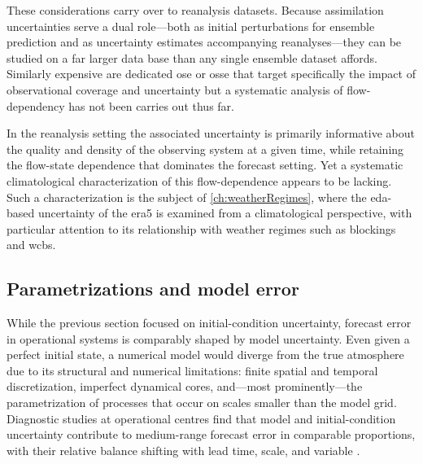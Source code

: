These considerations carry over to reanalysis datasets. Because
assimilation uncertainties serve a dual role---both as initial
perturbations for ensemble prediction
\parencite[ch.~6]{kalnayEarthSystemModeling2024} and as uncertainty estimates
accompanying reanalyses---they can be studied
on a far larger data base than any single ensemble dataset affords.
Similarly expensive are dedicated \gls{ose} or \gls{osse} that target
specifically the impact of observational coverage and uncertainty but
a systematic analysis of flow-dependency has not been carries out thus far.

In the
reanalysis setting the associated uncertainty is primarily informative
about the quality and density of the observing system at a given time,
while retaining the flow-state dependence that dominates the forecast
setting. Yet a systematic climatological characterization of this
flow-dependence appears to be lacking. Such a characterization is the
subject of \cref{ch:weatherRegimes}, where the \gls{eda}-based uncertainty of
the \gls{era5} is examined from a climatological perspective, with
particular attention to its relationship with weather regimes such as blockings
and \glspl{wcb}.


\subsection{Parametrizations and model error}\label{sec:intro_predictability_parametrization}
While the previous section focused on initial-condition uncertainty,
forecast error in operational systems is comparably shaped by model
uncertainty. Even given a perfect initial state, a numerical model would
diverge from the true atmosphere due to its structural and numerical
limitations: finite spatial and temporal discretization, imperfect dynamical
cores, and---most prominently---the parametrization of processes that
occur on scales smaller than the model grid. Diagnostic studies at
operational centres find that model and initial-condition uncertainty
contribute to medium-range forecast error in comparable proportions, with
their relative balance shifting with lead time, scale, and variable
\parencite{magnussonFactorsInfluencingSkill2013,
    magnussonDependenceInitialConditions2019,
    magnussonSkillMediumrangeForecast2022}.

